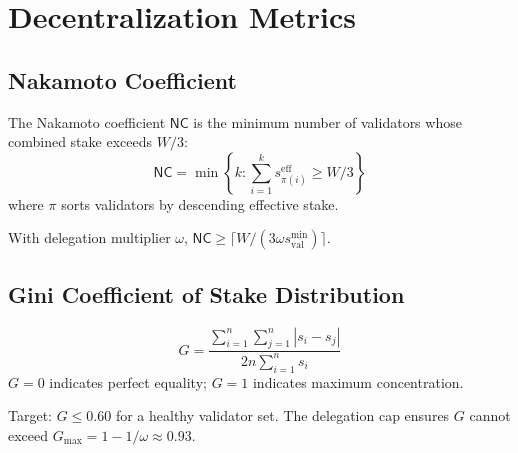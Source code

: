 \section{Decentralization Metrics}
\label{sec:decentralization}

\subsection{Nakamoto Coefficient}

\begin{definition}
The Nakamoto coefficient $\mathsf{NC}$ is the minimum number of validators whose combined stake exceeds $W/3$:
\begin{equation}
    \mathsf{NC} = \min \left\{ k : \sum_{i=1}^{k} s_{\pi(i)}^{\text{eff}} \geq W/3 \right\}
\end{equation}
where $\pi$ sorts validators by descending effective stake.
\end{definition}

\begin{proposition}
With delegation multiplier $\omega$, $\mathsf{NC} \geq \lceil W / (3 \omega s^{\min}_{\text{val}}) \rceil$.
\end{proposition}

\subsection{Gini Coefficient of Stake Distribution}

\begin{definition}
\begin{equation}
    G = \frac{\sum_{i=1}^{n} \sum_{j=1}^{n} |s_i - s_j|}{2n \sum_{i=1}^{n} s_i}
\end{equation}
$G = 0$ indicates perfect equality; $G = 1$ indicates maximum concentration.
\end{definition}

Target: $G \leq 0.60$ for a healthy validator set. The delegation cap ensures $G$ cannot exceed $G_{\max} = 1 - 1/\omega \approx 0.93$.

